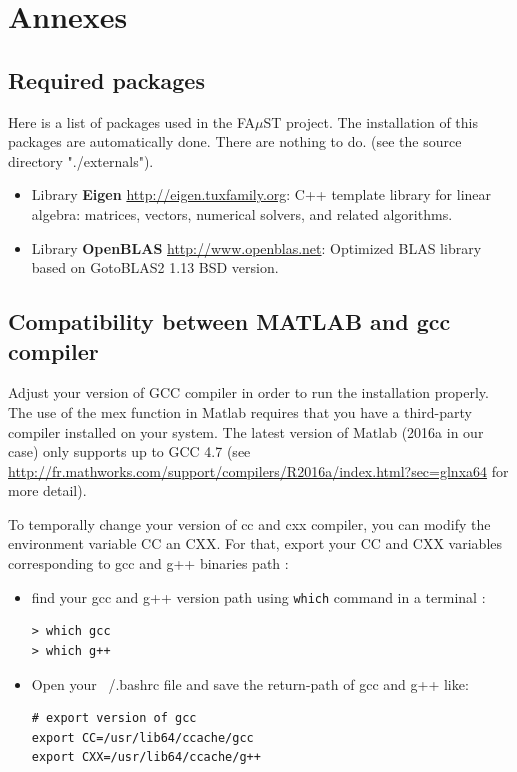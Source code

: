 \chapter{Annexes}\label{sec:Annexes}

\section{Required packages}\label{sec:ANNEXERequiredPackages}
Here is a list of packages used in the FA$\mu$ST project. The installation of this packages are automatically done. There are nothing to do. (see the source directory "./externals").
\begin{itemize}
\item Library \textbf{Eigen} \url{http://eigen.tuxfamily.org}: C++ template library for linear algebra: matrices, vectors, numerical solvers, and related algorithms.
\item Library \textbf{OpenBLAS} \url{http://www.openblas.net}:  Optimized BLAS library based on GotoBLAS2 1.13 BSD version.
\end{itemize}

\section{Compatibility between MATLAB and gcc compiler}\label{sec:ANNEXECompatibilityMatlabCompiler}
Adjust your version of GCC compiler in order to run the installation properly. The use of the mex function in Matlab requires that you have a third-party compiler installed on your system. The latest version of Matlab (2016a in our case) only supports up to GCC 4.7 (see \url{http://fr.mathworks.com/support/compilers/R2016a/index.html?sec=glnxa64} for more detail).

To temporally change your version of cc and cxx compiler, you can modify the environment variable CC an CXX. For that, export your CC and CXX variables corresponding to gcc and g++ binaries path :
\begin{itemize}
\item find your gcc and g++ version path using \texttt{which} command in a terminal :
\lstset{style=customBash}
\begin{lstlisting}
> which gcc
> which g++
\end{lstlisting}

\item Open your ~/.bashrc file and save the return-path of gcc and g++ like:
\lstset{style=customBash}
\begin{lstlisting}
# export version of gcc
export CC=/usr/lib64/ccache/gcc
export CXX=/usr/lib64/ccache/g++
\end{lstlisting}
\end{itemize}



